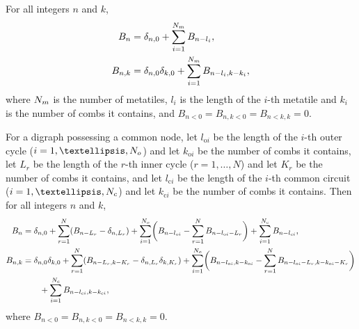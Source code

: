 \documentclass[10pt,a4paper]{amsart}
\newcommand{\rb}[1]{_{\rm #1}} %
\begin{document}
\begin{lem}\label{L:rr}
For all integers $n$ and $k$,
\begin{subequations}
\label{e:rr} 
\begin{align}\label{e:rrBn}
B_n&=\delta_{n,0}+\sum_{i=1}^{N\rb{m}}B_{n-l_i},\\
\label{e:rrBnk}
B_{n,k}&=\delta_{n,0}\delta_{k,0}+\sum_{i=1}^{N\rb{m}}B_{n-l_i,k-k_i},
\end{align}
\end{subequations}
where $N\rb{m}$ is the number of metatiles, $l_i$ is the length of the
$i$-th metatile and $k_i$ is the number of combs it contains, and
$B_{n<0}=B_{n,k<0}=B_{n<k,k}=0$.
\end{lem}

\begin{thm}\label{T:CN}
For a digraph possessing a common node, let $l_{\mathrm{o}i}$ be the
length of the $i$-th outer cycle ($i=1,\ldots,N\rb{o}$) and
let $k_{\mathrm{o}i}$ be the number of combs it contains, let $L_r$ be
the length of the $r$-th inner cycle ($r=1,\ldots,N$) and let $K_r$ be the
number of combs it contains, and let $l_{\mathrm{c}i}$ be the length
of the $i$-th common circuit ($i=1,\ldots,N\rb{c}$) and
let $k_{\mathrm{c}i}$ be the number of combs it contains. Then for all
integers $n$ and $k$,
\begin{subequations}
\label{e:CN}
\begin{align} 
\label{e:CNBn}
B_n&=\delta_{n,0}+ 
\sum_{r=1}^N (B_{n-L_r}-\delta_{n,L_r})+
\sum_{i=1}^{N\rb{o}}
\biggl(B_{n-l_{\mathrm{o}i}}-\sum_{r=1}^NB_{n-l_{\mathrm{o}i}-L_r}\biggr)
+\sum_{i=1}^{N\rb{c}} B_{n-l_{\mathrm{c}i}},\\
\label{e:CNBnk}
B_{n,k}&=\delta_{n,0}\delta_{k,0}+ 
\sum_{r=1}^N (B_{n-L_r,k-K_r}-\delta_{n,L_r}\delta_{k,K_r})+
\sum_{i=1}^{N\rb{o}}
\biggl(B_{n-l_{\mathrm{o}i},k-k_{\mathrm{o}i}}
-\sum_{r=1}^NB_{n-l_{\mathrm{o}i}-L_r,k-k_{\mathrm{o}i}-K_r}\biggr)\nonumber\\
&\qquad\mbox{}+\sum_{i=1}^{N\rb{c}} B_{n-l_{\mathrm{c}i},k-k_{\mathrm{c}i}},
\end{align} 
\end{subequations}
where $B_{n<0}=B_{n,k<0}=B_{n<k,k}=0$. 
\end{thm}
\end{document}
